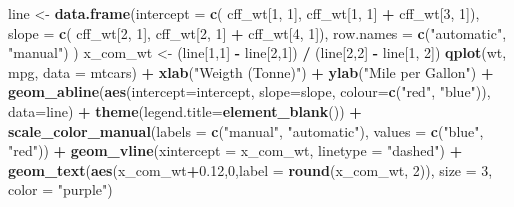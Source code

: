 \documentclass[]{article}
\newenvironment{Shaded}{\begin{snugshade}}{\end{snugshade}}
\newcommand{\KeywordTok}[1]{\textcolor[rgb]{0.13,0.29,0.53}{\textbf{#1}}}
\newcommand{\DataTypeTok}[1]{\textcolor[rgb]{0.13,0.29,0.53}{#1}}
\newcommand{\DecValTok}[1]{\textcolor[rgb]{0.00,0.00,0.81}{#1}}
\newcommand{\FloatTok}[1]{\textcolor[rgb]{0.00,0.00,0.81}{#1}}
\newcommand{\StringTok}[1]{\textcolor[rgb]{0.31,0.60,0.02}{#1}}
\newcommand{\OperatorTok}[1]{\textcolor[rgb]{0.81,0.36,0.00}{\textbf{#1}}}
\newcommand{\NormalTok}[1]{#1}
\begin{document}
\begin{Shaded}
\begin{Highlighting}[]
\NormalTok{line <-}\StringTok{ }\KeywordTok{data.frame}\NormalTok{(}\DataTypeTok{intercept =} \KeywordTok{c}\NormalTok{( cff_wt[}\DecValTok{1}\NormalTok{, }\DecValTok{1}\NormalTok{], cff_wt[}\DecValTok{1}\NormalTok{, }\DecValTok{1}\NormalTok{] }\OperatorTok{+}\StringTok{ }\NormalTok{cff_wt[}\DecValTok{3}\NormalTok{, }\DecValTok{1}\NormalTok{]),}
                   \DataTypeTok{slope =} \KeywordTok{c}\NormalTok{( cff_wt[}\DecValTok{2}\NormalTok{, }\DecValTok{1}\NormalTok{], cff_wt[}\DecValTok{2}\NormalTok{, }\DecValTok{1}\NormalTok{] }\OperatorTok{+}\StringTok{ }\NormalTok{cff_wt[}\DecValTok{4}\NormalTok{, }\DecValTok{1}\NormalTok{]), }
                   \DataTypeTok{row.names =} \KeywordTok{c}\NormalTok{(}\StringTok{"automatic"}\NormalTok{, }\StringTok{"manual"}\NormalTok{) )}
\NormalTok{x_com_wt <-}\StringTok{ }\NormalTok{(line[}\DecValTok{1}\NormalTok{,}\DecValTok{1}\NormalTok{] }\OperatorTok{-}\StringTok{ }\NormalTok{line[}\DecValTok{2}\NormalTok{,}\DecValTok{1}\NormalTok{]) }\OperatorTok{/}\StringTok{ }\NormalTok{(line[}\DecValTok{2}\NormalTok{,}\DecValTok{2}\NormalTok{] }\OperatorTok{-}\StringTok{ }\NormalTok{line[}\DecValTok{1}\NormalTok{, }\DecValTok{2}\NormalTok{]) }
\KeywordTok{qplot}\NormalTok{(wt, mpg, }\DataTypeTok{data =}\NormalTok{ mtcars) }\OperatorTok{+}\StringTok{ }
\StringTok{        }\KeywordTok{xlab}\NormalTok{(}\StringTok{"Weigth (Tonne)"}\NormalTok{) }\OperatorTok{+}\StringTok{ }\KeywordTok{ylab}\NormalTok{(}\StringTok{"Mile per Gallon"}\NormalTok{) }\OperatorTok{+}
\StringTok{        }\KeywordTok{geom_abline}\NormalTok{(}\KeywordTok{aes}\NormalTok{(}\DataTypeTok{intercept=}\NormalTok{intercept, }\DataTypeTok{slope=}\NormalTok{slope, }
                        \DataTypeTok{colour=}\KeywordTok{c}\NormalTok{(}\StringTok{"red"}\NormalTok{, }\StringTok{"blue"}\NormalTok{)), }\DataTypeTok{data=}\NormalTok{line) }\OperatorTok{+}\StringTok{ }
\StringTok{        }\KeywordTok{theme}\NormalTok{(}\DataTypeTok{legend.title=}\KeywordTok{element_blank}\NormalTok{()) }\OperatorTok{+}
\StringTok{        }\KeywordTok{scale_color_manual}\NormalTok{(}\DataTypeTok{labels =} \KeywordTok{c}\NormalTok{(}\StringTok{"manual"}\NormalTok{, }\StringTok{"automatic"}\NormalTok{), }\DataTypeTok{values =} \KeywordTok{c}\NormalTok{(}\StringTok{"blue"}\NormalTok{, }\StringTok{"red"}\NormalTok{)) }\OperatorTok{+}\StringTok{ }
\StringTok{        }\KeywordTok{geom_vline}\NormalTok{(}\DataTypeTok{xintercept =}\NormalTok{ x_com_wt, }\DataTypeTok{linetype =} \StringTok{"dashed"}\NormalTok{) }\OperatorTok{+}\StringTok{ }
\StringTok{        }\KeywordTok{geom_text}\NormalTok{(}\KeywordTok{aes}\NormalTok{(x_com_wt}\OperatorTok{+}\FloatTok{0.12}\NormalTok{,}\DecValTok{0}\NormalTok{,}\DataTypeTok{label =} \KeywordTok{round}\NormalTok{(x_com_wt, }\DecValTok{2}\NormalTok{)), }\DataTypeTok{size =} \DecValTok{3}\NormalTok{, }
                  \DataTypeTok{color =} \StringTok{"purple"}\NormalTok{)}
\end{Highlighting}
\end{Shaded}
\end{document}
